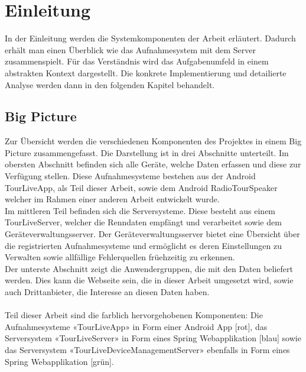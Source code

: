 \chapter{Einleitung}

In der Einleitung werden die Systemkomponenten der Arbeit erläutert. Dadurch erhält man einen Überblick wie das Aufnahmesystem mit dem Server zusammenspielt. Für das Verständnis wird das Aufgabenumfeld in einem abstrakten Kontext dargestellt. Die konkrete Implementierung und detailierte Analyse werden dann in den folgenden Kapitel behandelt.

\section{Big Picture}

Zur Übersicht werden die verschiedenen Komponenten des Projektes in einem Big Picture zusammengefasst. Die Darstellung ist in drei Abschnitte unterteilt. Im obersten Abschnitt befinden sich alle Geräte, welche Daten erfassen und diese zur Verfügung stellen. Diese Aufnahmesysteme bestehen aus der Android TourLiveApp, als Teil dieser Arbeit, sowie dem Android RadioTourSpeaker welcher im Rahmen einer anderen Arbeit entwickelt wurde. \\
Im mittleren Teil befinden sich die Serversysteme. Diese besteht aus einem TourLiveServer, welcher die Renndaten empfängt und verarbeitet sowie dem Geräteverwaltungsserver. Der Geräteverwaltungsserver bietet eine Übersicht über die registrierten Aufnahmesysteme und ermöglicht es deren Einstellungen zu Verwalten sowie allfällige Fehlerquellen früehzeitig zu erkennen.\\
Der unterste Abschnitt zeigt die Anwendergruppen, die mit den Daten beliefert werden. Dies kann die Webseite sein, die in dieser Arbeit umgesetzt wird, sowie auch Drittanbieter, die Interesse an diesen Daten haben.\\
\\
Teil dieser Arbeit sind die farblich hervorgehobenen Komponenten: Die Aufnahmesysteme «TourLiveApp» in Form einer Android App [rot], das Serversystem «TourLiveServer» in Form eines Spring Webapplikation [blau] sowie das Serversystem «TourLiveDeviceManagementServer» ebenfalls in Form eines Spring Webapplikation [grün].

